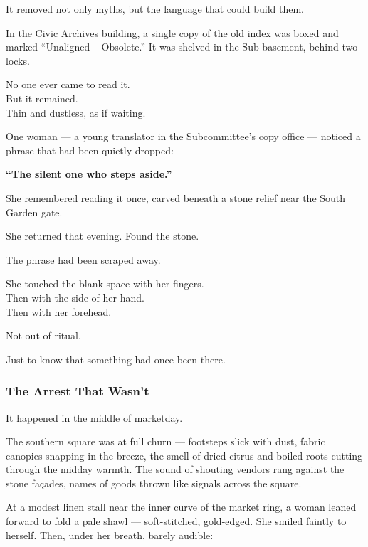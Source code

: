 \documentclass[12pt]{article}
\begin{document}
It removed not only myths, but the language that could build them.

\vspace{1em}

In the Civic Archives building, a single copy of the old index was boxed and marked “Unaligned – Obsolete.” It was shelved in the Sub-basement, behind two locks.

No one ever came to read it.\\
But it remained.\\
Thin and dustless, as if waiting.

\vspace{1em}

One woman --- a young translator in the Subcommittee’s copy office --- noticed a phrase that had been quietly dropped:

\begin{center}
\textbf{“The silent one who steps aside.”}
\end{center}

She remembered reading it once, carved beneath a stone relief near the South Garden gate.

She returned that evening. Found the stone.

The phrase had been scraped away.

She touched the blank space with her fingers.\\
Then with the side of her hand.\\
Then with her forehead.

Not out of ritual.

Just to know that something had once been there.

\dotfill

\subsubsection{The Arrest That Wasn’t}

It happened in the middle of marketday.

The southern square was at full churn --- footsteps slick with dust, fabric canopies snapping in the breeze, the smell of dried citrus and boiled roots cutting through the midday warmth. The sound of shouting vendors rang against the stone façades, names of goods thrown like signals across the square.

At a modest linen stall near the inner curve of the market ring, a woman leaned forward to fold a pale shawl --- soft-stitched, gold-edged. She smiled faintly to herself. Then, under her breath, barely audible:
\end{document}
